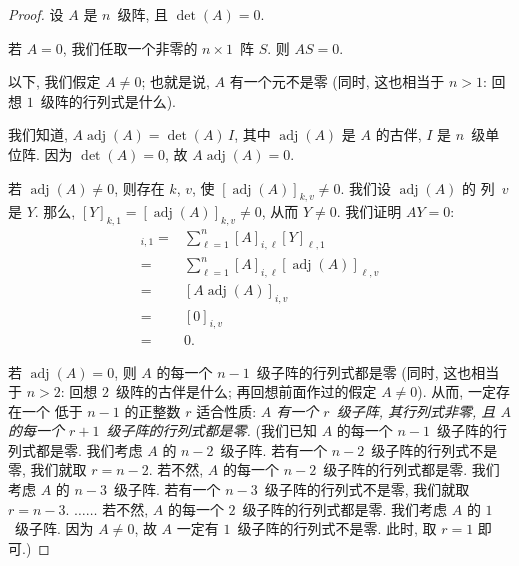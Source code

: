 \begin{proof}
    设 \(A\) 是 \(n\)~级阵,
    且 \(\det {(A)} = 0\).

    若 \(A = 0\),
    我们任取一个非零的 \(n \times 1\)~阵 \(S\).
    则 \(AS = 0\).

    以下, 我们假定 \(A \neq 0\);
    也就是说, \(A\) 有一个元不是零
    (同时, 这也相当于 \(n > 1\):
    回想 \(1\)~级阵的行列式是什么).

    我们知道,
    \(A \operatorname{adj} {(A)} = \det {(A)}\, I\),
    其中 \(\operatorname{adj} {(A)}\)
    是 \(A\) 的古伴,
    \(I\) 是 \(n\)~级单位阵.
    因为 \(\det {(A)} = 0\),
    故 \(A \operatorname{adj} {(A)} = 0\).

    若 \(\operatorname{adj} {(A)} \neq 0\),
    则存在 \(k\), \(v\), 使
    \([\operatorname{adj} {(A)}]_{k,v} \neq 0\).
    我们设 \(\operatorname{adj} {(A)}\) 的%
    列~\(v\) 是 \(Y\).
    那么, \([Y]_{k,1}
        = [\operatorname{adj} {(A)}]_{k,v} \neq 0\),
    从而 \(Y \neq 0\).
    我们证明 \(AY = 0\):
    \begin{align*}
        [AY]_{i,1}
        = {} &
        \sum_{\ell = 1}^{n}
        {[A]_{i,\ell} [Y]_{\ell,1}}
        \\
        = {} &
        \sum_{\ell = 1}^{n}
        {[A]_{i,\ell} [\operatorname{adj} {(A)}]_{\ell,v}}
        \\
        = {} &
        [A \operatorname{adj} {(A)}]_{i,v}
        \\
        = {} &
        [0]_{i,v}
        \\
        = {} &
        0.
    \end{align*}

    若 \(\operatorname{adj} {(A)} = 0\),
    则 \(A\) 的每一个 \(n-1\)~级子阵的行列式都是零
    (同时, 这也相当于 \(n > 2\):
    回想 \(2\)~级阵的古伴是什么;
    再回想前面作过的假定 \(A \neq 0\)).
    从而, 一定存在一个%
    低于 \(n-1\) 的正整数 \(r\)
    适合性质:
    \emph{\(A\) 有一个 \(r\)~级子阵, 其行列式非零,
        且 \(A\) 的每一个 \(r+1\)~级子阵的行列式都是零.}
    (我们已知 \(A\) 的每一个 \(n-1\)~级子阵的行列式都是零.
    我们考虑 \(A\) 的 \(n-2\)~级子阵.
    若有一个 \(n-2\)~级子阵的行列式不是零,
    我们就取 \(r = n-2\).
    若不然, \(A\) 的每一个 \(n-2\)~级子阵的行列式都是零.
    我们考虑 \(A\) 的 \(n-3\)~级子阵.
    若有一个 \(n-3\)~级子阵的行列式不是零,
    我们就取 \(r = n-3\).
    \(\dots \dots\)
    若不然, \(A\) 的每一个 \(2\)~级子阵的行列式都是零.
    我们考虑 \(A\) 的 \(1\)~级子阵.
    因为 \(A \neq 0\),
    故 \(A\) 一定有 \(1\)~级子阵的行列式不是零.
    此时, 取 \(r = 1\) 即可.)


\end{proof}
